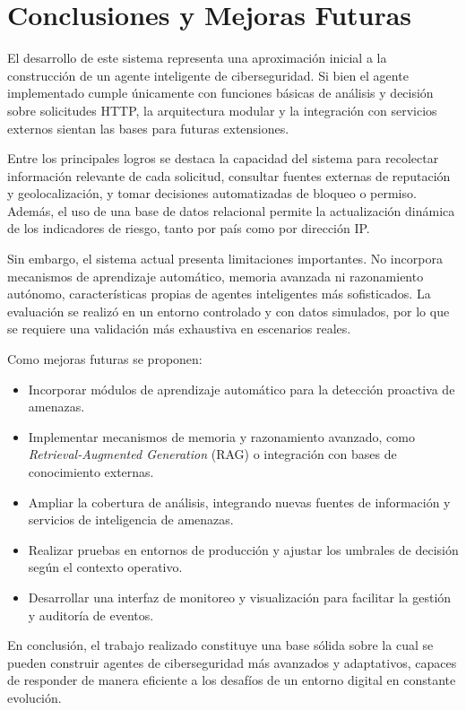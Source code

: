 \section{Conclusiones y Mejoras Futuras}

El desarrollo de este sistema representa una aproximación inicial a la construcción de un agente inteligente de ciberseguridad. Si bien el agente implementado cumple únicamente con funciones básicas de análisis y decisión sobre solicitudes HTTP, la arquitectura modular y la integración con servicios externos sientan las bases para futuras extensiones.

Entre los principales logros se destaca la capacidad del sistema para recolectar información relevante de cada solicitud, consultar fuentes externas de reputación y geolocalización, y tomar decisiones automatizadas de bloqueo o permiso. Además, el uso de una base de datos relacional permite la actualización dinámica de los indicadores de riesgo, tanto por país como por dirección IP\@{}.

Sin embargo, el sistema actual presenta limitaciones importantes. No incorpora mecanismos de aprendizaje automático, memoria avanzada ni razonamiento autónomo, características propias de agentes inteligentes más sofisticados. La evaluación se realizó en un entorno controlado y con datos simulados, por lo que se requiere una validación más exhaustiva en escenarios reales.

Como mejoras futuras se proponen:

\begin{itemize}
    \item Incorporar módulos de aprendizaje automático para la detección proactiva de amenazas.
    \item Implementar mecanismos de memoria y razonamiento avanzado, como \textit{Retrieval-Augmented Generation} (RAG) o integración con bases de conocimiento externas.
    \item Ampliar la cobertura de análisis, integrando nuevas fuentes de información y servicios de inteligencia de amenazas.
    \item Realizar pruebas en entornos de producción y ajustar los umbrales de decisión según el contexto operativo.
    \item Desarrollar una interfaz de monitoreo y visualización para facilitar la gestión y auditoría de eventos.
\end{itemize}

En conclusión, el trabajo realizado constituye una base sólida sobre la cual se pueden construir agentes de ciberseguridad más avanzados y adaptativos, capaces de responder de manera eficiente a los desafíos de un entorno digital en constante evolución.